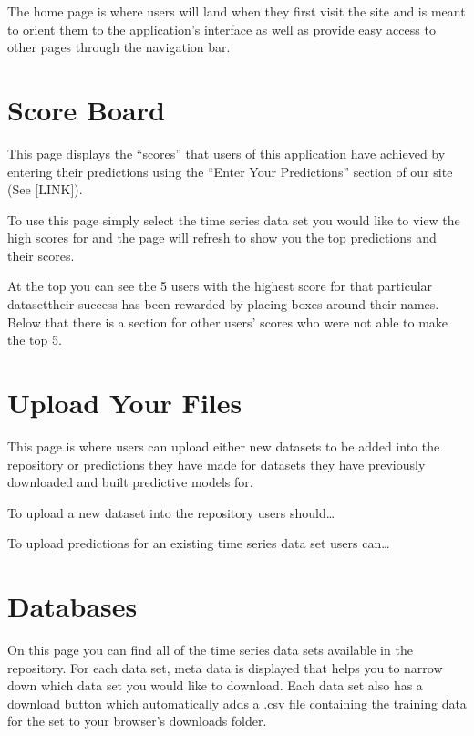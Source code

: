 \documentclass[letterpaper,10pt,english,openany,oneside]{sphinxmanual}
\begin{document}
\sphinxAtStartPar
The home page is where users will land when they first visit the site and is meant to orient them to the application’s interface as well as provide easy access to other pages through the navigation bar.


\section{Score Board}
\label{\detokenize{site:score-board}}
\sphinxAtStartPar
This page displays the “scores” that users of this application have achieved by entering their predictions using the “Enter Your Predictions” section of our site (See {[}LINK{]}).

\sphinxAtStartPar
To use this page simply select the time series data set you would like to view the high scores for and the page will refresh to show you the top predictions and their scores.

\sphinxAtStartPar
At the top you can see the 5 users with the highest score for that particular dataset\textendash{}their success has been rewarded by placing boxes around their names. Below that there is a section for other users’ scores who were not able to make the top 5.


\section{Upload Your Files}
\label{\detokenize{site:upload-your-files}}
\sphinxAtStartPar
This page is where users can upload either new datasets to be added into the repository or predictions they have made for datasets they have previously downloaded and built predictive models for.

\sphinxAtStartPar
To upload a new dataset into the repository users should…

\sphinxAtStartPar
To upload predictions for an existing time series data set users can…


\section{Databases}
\label{\detokenize{site:databases}}
\sphinxAtStartPar
On this page you can find all of the time series data sets available in the repository. For each data set, meta data is displayed that helps you to narrow down which data set you would like to download. Each data set also has a download button which automatically adds a .csv file containing the training data for the set to your browser’s downloads folder.
\end{document}
